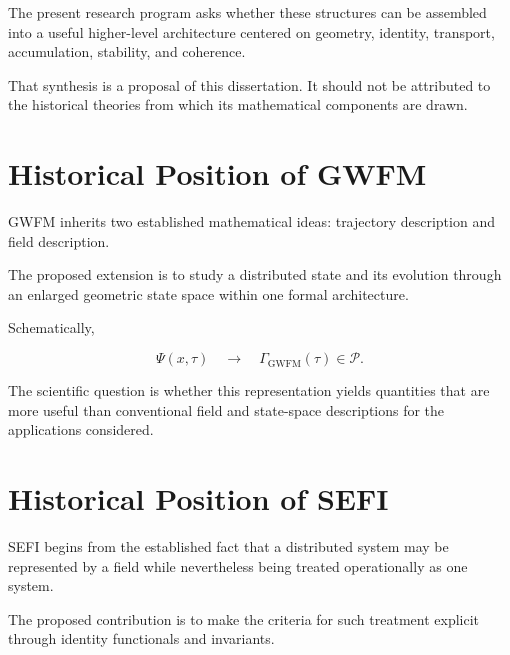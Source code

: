 \documentclass[12pt,oneside]{book}
\newcommand{\GWFM}{\mathrm{GWFM}}
\begin{document}
The present research program asks whether these structures can
be assembled into a useful higher-level architecture centered
on geometry, identity, transport, accumulation, stability, and
coherence.

That synthesis is a proposal of this dissertation. It should
not be attributed to the historical theories from which its
mathematical components are drawn.


\section{Historical Position of GWFM}
\label{sec:historical-position-gwfm}

GWFM inherits two established mathematical ideas: trajectory
description and field description.

The proposed extension is to study a distributed state and its
evolution through an enlarged geometric state space within one
formal architecture.

Schematically,

\begin{equation}
    \Psi(x,\tau)
    \quad\longrightarrow\quad
    \Gamma_{\GWFM}(\tau)
    \in
    \mathcal{P}.
    \label{eq:gwfm-historical-position}
\end{equation}

The scientific question is whether this representation yields
quantities that are more useful than conventional field and
state-space descriptions for the applications considered.


\section{Historical Position of SEFI}
\label{sec:historical-position-sefi}

SEFI begins from the established fact that a distributed system
may be represented by a field while nevertheless being treated
operationally as one system.

The proposed contribution is to make the criteria for such
treatment explicit through identity functionals and invariants.
\end{document}
